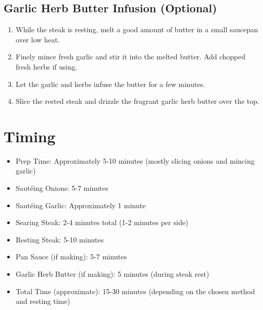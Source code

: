 \documentclass[openany, 12pt]{article}
\begin{document}
\subsection{Garlic Herb Butter Infusion (Optional)} \begin{enumerate}
	\item While the steak is resting, melt a good amount of butter in a
	      small saucepan over low heat. \item Finely mince fresh garlic
	      and stir it into the melted butter. Add chopped fresh herbs if
	      using. \item Let the garlic and herbs infuse the butter for a
	      few minutes. \item Slice the rested steak and drizzle the fragrant
	      garlic herb butter over the top. \end{enumerate}

\section{Timing} \begin{itemize} \item Prep Time: Approximately 5-10 minutes
	      (mostly slicing onions and mincing garlic) \item Sautéing Onions: 5-7
	      minutes \item Sautéing Garlic: Approximately 1 minute \item Searing Steak:
	      2-4 minutes total (1-2 minutes per side) \item Resting Steak: 5-10 minutes
	\item Pan Sauce (if making): 5-7 minutes \item Garlic Herb Butter (if
	      making): 5 minutes (during steak rest) \item Total Time (approximate):
	      15-30 minutes (depending on the chosen method and resting time)
\end{itemize}
\end{document}
